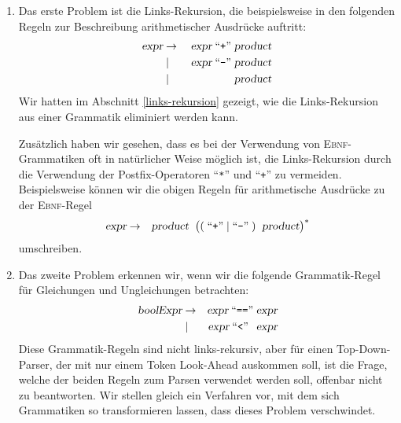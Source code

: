 \begin{enumerate}
\item Das erste Problem ist die Links-Rekursion, die beispielsweise in den folgenden
      Regeln zur Beschreibung arithmetischer Ausdr\"ucke auftritt:
      \begin{eqnarray*}
        \textsl{expr}    & \rightarrow & \;\textsl{expr} \;\mbox{``\texttt{+}''}\; \textsl{product}  \\
                         & \mid        & \;\textsl{expr} \;\mbox{``\texttt{-}''}\; \textsl{product}  \\
                         & \mid        & \;\textsl{product}                           
      \end{eqnarray*}
      Wir hatten im Abschnitt \ref{links-rekursion} gezeigt, wie die Links-Rekursion aus
      einer Grammatik eliminiert werden kann. 
      
      Zus\"atzlich haben wir gesehen, dass es bei der Verwendung von \textsc{Ebnf}-Grammatiken 
      oft in nat\"urlicher Weise m\"oglich ist, die Links-Rekursion durch die Verwendung der
      Postfix-Operatoren ``\texttt{*}'' und ``\texttt{+}'' zu vermeiden.  Beispielsweise
      k\"onnen wir die obigen Regeln f\"ur arithmetische Ausdr\"ucke zu der \textsc{Ebnf}-Regel
      \begin{eqnarray*} 
        \textsl{expr}    & \rightarrow & \textsl{product}\;\; \bigl((\;\mbox{``\texttt{+}''}\;|\;\mbox{``\texttt{-}''}\;) \;\;\textsl{product}\bigr)^* 
      \end{eqnarray*}
      umschreiben.
\item Das zweite Problem erkennen wir, wenn wir die folgende Grammatik-Regel f\"ur 
      Gleichungen und Ungleichungen betrachten:
      \begin{eqnarray*}
        \textsl{boolExpr} & \rightarrow & \textsl{expr} \;\mbox{``\texttt{==}''}\;    \textsl{expr} \\
                          & \mid        & \textsl{expr} \;\mbox{``\texttt{<}''}\;\;\, \textsl{expr} 
      \end{eqnarray*}
      Diese Grammatik-Regeln sind nicht links-rekursiv, aber
      f\"ur einen Top-Down-Parser, der mit nur einem Token Look-Ahead
      auskommen soll, ist die Frage, welche der beiden Regeln zum Parsen verwendet
      werden soll, offenbar nicht zu beantworten.  Wir stellen gleich ein Verfahren vor, mit dem sich
      Grammatiken so transformieren lassen, dass dieses Problem verschwindet.
\end{enumerate}

